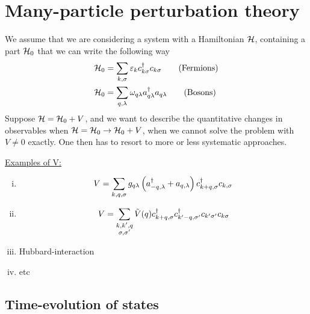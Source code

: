 \section[Perturbation theory]{Many-particle perturbation theory}

We assume that we are considering a system with a Hamiltonian $\mathcal{H}$, containing a part $\mathcal{H}_0$ that we can write the following way
\begin{align} 
\mathcal{H}_0 &= \sum_{k,\sigma}\varepsilon_kc^{\dagger}_{k\sigma}c_{k\sigma} \qquad \text{(Fermions)} \\
\mathcal{H}_0 &= \sum_{q, \lambda}\omega_{q\lambda}a^{\dagger}_{q\lambda} a_{q\lambda} \qquad \text{(Bosons)}
\end{align}
Suppose $\mathcal{H} = \mathcal{H}_0 + V$, and we want to describe the quantitative changes in observables when $\mathcal{H} = \mathcal{H}_0 \rightarrow \mathcal{H}_0 + V$, when we cannot solve the problem with $V\ne 0$ exactly. One then has to resort to more or less systematic approaches.

\underline{Examples of V:}
\begin{enumerate}[i)]
	\item \[V = \sum_{k,q,\sigma}g_{q\lambda}\left( a_{-q,\lambda}^\dagger + a_{q,\lambda} \right)c^{\dagger}_{k+q,\sigma}c_{k,\sigma}\]
	\item \[V=\sum_{\substack{k,k',q \\ \sigma,\sigma'}}\tilde{V}(q)c^{\dagger}_{k+q,\sigma}c^{\dagger}_{k'-q, \sigma'}c_{k'\sigma'}c_{k\sigma}\]
	\item Hubbard-interaction
	\item etc
\end{enumerate}

\subsection{Time-evolution of states}

